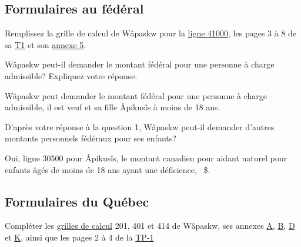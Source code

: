 \subsection{Formulaires au fédéral}
Remplissez la grille de calcul de Wâpaskw pour la  \href{https://www.canada.ca/fr/agence-revenu/services/formulaires-publications/trousses-impot-toutes-annees-imposition/trousse-generale-impot-prestations/5000-d1.html}{ligne 41000}, les pages 3 à 8 de sa \href{https://www.canada.ca/fr/agence-revenu/services/formulaires-publications/trousses-impot-toutes-annees-imposition/trousse-generale-impot-prestations/quebec/5005-r.html}{T1} et son \href{https://www.canada.ca/fr/agence-revenu/services/formulaires-publications/trousses-impot-toutes-annees-imposition/trousse-generale-impot-prestations/5000-s5.html}{annexe 5}.

\setcounter{question}{0}
\begin{question}
	Wâpaskw peut-il demander le montant fédéral pour une personne à charge admissible? Expliquez votre réponse.
\end{question}
Wâpaskw peut demander le montant fédéral pour une personne à charge admissible, il est veuf et sa fille Âpikusîs à moins de 18 ans.

\begin{question}
	D'après votre réponse à la question 1, Wâpaskw peut-il demander d'autres montants personnels fédéraux pour ses enfants?
\end{question}
Oui, ligne 30500 pour Âpikusîs, le montant canadien pour aidant naturel pour enfants âgés de moins de 18 ans ayant une déficience, ~\$.


\subsection{Formulaires du Québec}
Compléter les \href{https://www.revenuquebec.ca/documents/fr/formulaires/tp/2023-12/TP-1.D.GR%282023-12%29.pdf}{grilles de calcul} 201, 401 et 414 de Wâpaskw, ses annexes \href{https://www.revenuquebec.ca/documents/fr/formulaires/tp/2023-12/TP-1.D.A%282023-12%29.pdf}{A}, \href{https://www.revenuquebec.ca/documents/fr/formulaires/tp/2023-12/TP-1.D.B%282023-12%29.pdf}{B}, \href{https://www.revenuquebec.ca/documents/fr/formulaires/tp/2023-12/TP-1.D.D%282023-12%29.pdf}{D} et \href{https://www.revenuquebec.ca/documents/fr/formulaires/tp/2023-12/TP-1.D.K%282023-12%29.pdf}{K}, ainsi que les pages 2 à 4 de la \href{https://www.revenuquebec.ca/documents/fr/formulaires/tp/2023-12/TP-1.D%282023-12%29.pdf}{TP-1}

